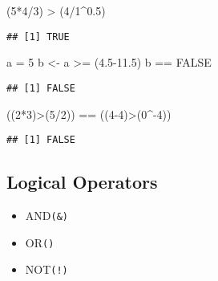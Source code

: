 \documentclass[
]{article}
\newenvironment{Shaded}{\begin{snugshade}}{\end{snugshade}}
\newcommand{\ConstantTok}[1]{\textcolor[rgb]{0.00,0.00,0.00}{#1}}
\newcommand{\DecValTok}[1]{\textcolor[rgb]{0.00,0.00,0.81}{#1}}
\newcommand{\FloatTok}[1]{\textcolor[rgb]{0.00,0.00,0.81}{#1}}
\newcommand{\NormalTok}[1]{#1}
\newcommand{\OtherTok}[1]{\textcolor[rgb]{0.56,0.35,0.01}{#1}}
\newcommand{\SpecialCharTok}[1]{\textcolor[rgb]{0.00,0.00,0.00}{#1}}
\providecommand{\tightlist}{%
  \setlength{\itemsep}{0pt}\setlength{\parskip}{0pt}}
\begin{document}
\begin{Shaded}
\begin{Highlighting}[]
\NormalTok{(}\DecValTok{5}\SpecialCharTok{*}\DecValTok{4}\SpecialCharTok{/}\DecValTok{3}\NormalTok{) }\SpecialCharTok{\textgreater{}}\NormalTok{ (}\DecValTok{4}\SpecialCharTok{/}\DecValTok{1}\SpecialCharTok{\^{}}\FloatTok{0.5}\NormalTok{)}
\end{Highlighting}
\end{Shaded}

\begin{verbatim}
## [1] TRUE
\end{verbatim}

\begin{Shaded}
\begin{Highlighting}[]
\NormalTok{a }\OtherTok{=} \DecValTok{5}
\NormalTok{b }\OtherTok{\textless{}{-}}\NormalTok{ a }\SpecialCharTok{\textgreater{}=}\NormalTok{ (}\FloatTok{4.5{-}11.5}\NormalTok{)}
\NormalTok{b }\SpecialCharTok{==} \ConstantTok{FALSE}
\end{Highlighting}
\end{Shaded}

\begin{verbatim}
## [1] FALSE
\end{verbatim}

\begin{Shaded}
\begin{Highlighting}[]
\NormalTok{((}\DecValTok{2}\SpecialCharTok{*}\DecValTok{3}\NormalTok{)}\SpecialCharTok{\textgreater{}}\NormalTok{(}\DecValTok{5}\SpecialCharTok{/}\DecValTok{2}\NormalTok{)) }\SpecialCharTok{==}\NormalTok{ ((}\DecValTok{4{-}4}\NormalTok{)}\SpecialCharTok{\textgreater{}}\NormalTok{(}\DecValTok{0}\SpecialCharTok{\^{}{-}}\DecValTok{4}\NormalTok{))}
\end{Highlighting}
\end{Shaded}

\begin{verbatim}
## [1] FALSE
\end{verbatim}

\hypertarget{logical-operators}{%
\subsection{Logical Operators}\label{logical-operators}}

\begin{itemize}
\tightlist
\item
  AND\texttt{(\&)}\\
\item
  OR\texttt{(\textbar{})}\\
\item
  NOT\texttt{(!)}
\end{itemize}
\end{document}
